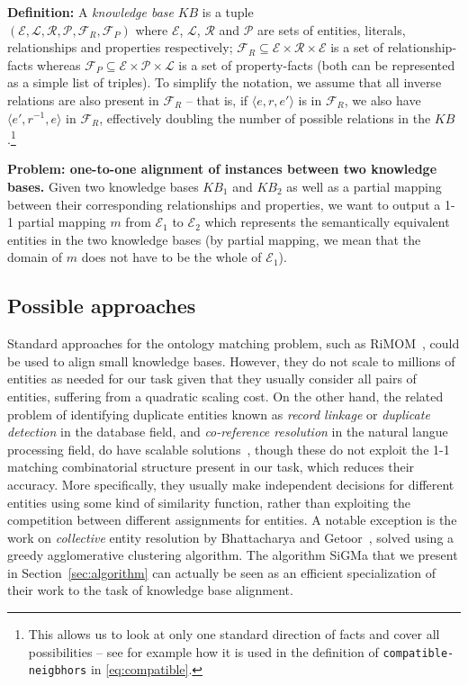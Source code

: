 \documentclass{sig-alternate}
\renewcommand{\tt}[1]{\texttt{#1}}
\newcommand{\ts}[1]{\textsf{#1}}
\newcommand{\KB}{K\!B}
\begin{document}
\textbf{Definition:} A \emph{knowledge base} $\KB$ is a tuple \\
$(\mathcal{E},\mathcal{L},\mathcal{R},\mathcal{P},\mathcal{F}_R,\mathcal{F}_P)$ where $\mathcal{E}$, $\mathcal{L}$, $\mathcal{R}$ and $\mathcal{P}$ are sets of entities, literals, relationships and properties respectively; $\mathcal{F}_R \subseteq \mathcal{E}\times\mathcal{R}\times\mathcal{E}$ is a set of relationship-facts whereas $\mathcal{F}_P \subseteq \mathcal{E}\times\mathcal{P}\times\mathcal{L}$ is a set of property-facts (both can be represented as a simple list of triples). To simplify the notation, we assume that all inverse relations are also present in $\mathcal{F}_R$ -- that is, if $\langle e,r,e' \rangle$ is in $\mathcal{F}_R$, we also have $\langle e',r^{-1}, e \rangle$ in $\mathcal{F}_R$, effectively doubling the number of possible relations in the $\KB$.\footnote{This allows us to look at only one standard direction of facts and cover all possibilities -- see for example how it is used in the definition of \tt{compatible-neigbhors} in \eqref{eq:compatible}.}

\textbf{Problem: one-to-one alignment of instances between two knowledge bases.}  Given two knowledge bases $\KB_1$ and $\KB_2$ as well as a partial mapping between their corresponding relationships and properties, we want to output a 1-1 partial mapping $m$ from $\mathcal{E}_1$ to $\mathcal{E}_2$ which represents the semantically equivalent entities in the two knowledge bases (by partial mapping, we mean that the domain of $m$ does not have to be the whole of $\mathcal{E}_1$). %

\subsection{Possible approaches} \label{ssec:approaches}
Standard approaches for the ontology matching problem, such as RiMOM~\cite{li09RiMOM}, could be used to align small knowledge bases. However, they do not scale to millions of entities as needed for our task given that they usually consider all pairs of entities, suffering from a quadratic scaling cost. On the other hand, the related problem of identifying duplicate entities known as \emph{record linkage} or \emph{duplicate detection} in the database field, and \emph{co-reference resolution} in the natural langue processing field, do have scalable solutions~\cite{arasu09deduplication,gracia09largeScaleSenses}, though these do not exploit the 1-1 matching combinatorial structure present in our task, which reduces their accuracy. More specifically, they usually make independent decisions for different entities using some kind of similarity function, rather than exploiting the competition between different assignments for entities.
%
A notable exception is the work on \emph{collective} entity resolution by Bhattacharya and Getoor~\cite{getoor07relational}, solved using a greedy agglomerative clustering algorithm. The algorithm \ts{SiGMa} that we present in Section~\ref{sec:algorithm} can actually be seen as an efficient specialization of their work to the task of knowledge base alignment.
\end{document}
